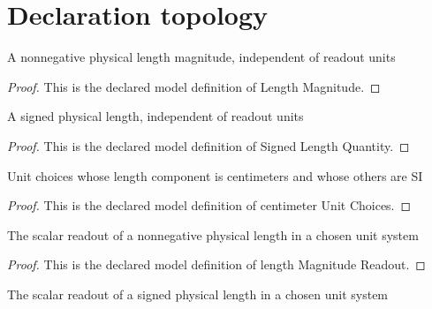 \section{Declaration topology}
\begin{definition}
  \label{def:physics:phyx-mini-0056:phyxminiproblems-problemphyxmini0056-lengthmagnitude}
  A nonnegative physical length magnitude, independent of readout units
\end{definition}
\begin{proof}
  This is the declared model definition of Length Magnitude.
\end{proof}
\begin{definition}
  \label{def:physics:phyx-mini-0056:phyxminiproblems-problemphyxmini0056-signedlengthquantity}
  A signed physical length, independent of readout units
\end{definition}
\begin{proof}
  This is the declared model definition of Signed Length Quantity.
\end{proof}
\begin{definition}
  \label{def:physics:phyx-mini-0056:phyxminiproblems-problemphyxmini0056-centimeterunitchoices}
  Unit choices whose length component is centimeters and whose others are SI
\end{definition}
\begin{proof}
  This is the declared model definition of centimeter Unit Choices.
\end{proof}
\begin{definition}
  \label{def:physics:phyx-mini-0056:phyxminiproblems-problemphyxmini0056-lengthmagnitudereadout}
  The scalar readout of a nonnegative physical length in a chosen unit system
\end{definition}
\begin{proof}
  This is the declared model definition of length Magnitude Readout.
\end{proof}
\begin{definition}
  \label{def:physics:phyx-mini-0056:phyxminiproblems-problemphyxmini0056-signedlengthreadout}
  The scalar readout of a signed physical length in a chosen unit system
\end{definition}
